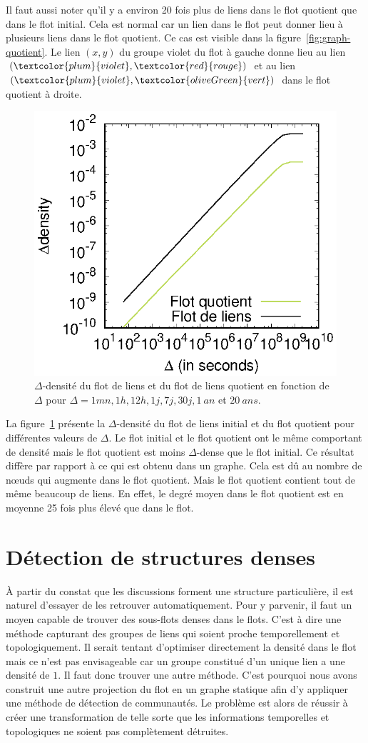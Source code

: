 Il faut aussi noter qu'il y a environ 20 fois plus de liens dans le flot quotient que dans le flot initial.
Cela est normal car un lien dans le flot peut donner lieu à plusieurs liens dans le flot quotient.
Ce cas est visible dans la figure~\ref{fig:graph-quotient}. 
Le lien $(x,y)$ du groupe violet du flot à gauche donne lieu au lien $(\textcolor{plum}{violet}, \textcolor{red}{rouge})$ et au lien $(\textcolor{plum}{violet}, \textcolor{oliveGreen}{vert})$ dans le flot quotient à droite. 

\begin{figure}
\centering
	\includegraphics[width=0.4\linewidth]{img/mailing/quotient-density}
	\caption{$\Delta$-densité du flot de liens et du flot de liens quotient en fonction de $\Delta$ pour $\Delta=1mn, 1h, 12h, 1j, 7j, 30j, 1\ an$ et $20\ ans$.}
	\label{fig:quotient-stream-density}
\end{figure}

La figure~\ref{fig:quotient-stream-density} présente la $\Delta$-densité du flot de liens initial et du flot quotient pour différentes valeurs de $\Delta$.
Le flot initial et le flot quotient ont le même comportant de densité mais le flot quotient est moins $\Delta$-dense que le flot initial.
Ce résultat diffère par rapport à ce qui est obtenu dans un graphe.
Cela est dû au nombre de n\oe{}uds qui augmente dans le flot quotient.
Mais le flot quotient contient tout de même beaucoup de liens. 
En effet, le degré moyen dans le flot quotient est en moyenne 25 fois plus élevé que dans le flot.


\section{Détection de structures denses}

\`A partir du constat que les discussions forment une structure particulière, il est naturel d'essayer de les retrouver automatiquement. 
Pour y parvenir, il faut un moyen capable de trouver des sous-flots denses dans le flots.
C'est à dire une méthode capturant des groupes de liens qui soient proche temporellement et topologiquement.
Il serait tentant d'optimiser directement la densité dans le flot mais ce n'est pas envisageable car un groupe constitué d'un unique lien a une densité de $1$.
Il faut donc trouver une autre méthode.
C'est pourquoi nous avons construit une autre projection du flot en un graphe statique afin d'y appliquer une méthode de détection de communautés.
Le problème est alors de réussir à créer une transformation de telle sorte que les informations temporelles et topologiques ne soient pas complètement détruites.

